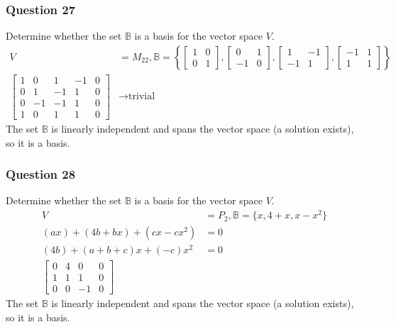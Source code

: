 \documentclass{math}
\begin{document}
\subsubsection*{Question 27}
Determine whether the set \( \mathbb{B} \) is a basis for the vector space
\( V \).
\begin{align*}
  V &= M_{22}, \mathbb{B} = \left\{
    \begin{bmatrix}1 & 0 \\ 0 & 1\end{bmatrix},
    \begin{bmatrix}0 & 1 \\ -1 & 0\end{bmatrix},
    \begin{bmatrix}1 & -1 \\ -1 & 1\end{bmatrix},
    \begin{bmatrix}-1 & 1 \\ 1 & 1\end{bmatrix}
  \right\} \\
  \left[\begin{array}{cccc|c}
    1 & 0 & 1 & -1 & 0 \\
    0 & 1 & -1 & 1 & 0 \\
    0 & -1 & -1 & 1 & 0 \\
    1 & 0 & 1 & 1 & 0
  \end{array}\right] &\to \text{trivial}
\end{align*}
The set \( \mathbb{B} \) is linearly independent and spans the vector space
(a solution exists), so it is a basis.

\subsubsection*{Question 28}
Determine whether the set \( \mathbb{B} \) is a basis for the vector space
\( V \).
\begin{align*}
  V &= P_2, \mathbb{B} = \{x,4+x,x-x^2\} \\
  (ax)+(4b+bx)+(cx-cx^2) &= 0 \\
  (4b)+(a+b+c)x+(-c)x^2 &= 0 \\
  \left[\begin{array}{ccc|c}
    0 & 4 & 0 & 0 \\
    1 & 1 & 1 & 0 \\
    0 & 0 & -1 & 0
  \end{array}\right]
\end{align*}
The set \( \mathbb{B} \) is linearly independent and spans the vector space
(a solution exists), so it is a basis.
\end{document}
